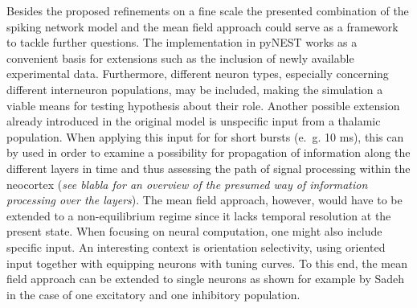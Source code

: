 Besides the proposed refinements on a fine scale
the presented combination of the spiking network model and the mean field approach
could serve as a framework to tackle further questions. 
The implementation in pyNEST works as a convenient basis for extensions 
such as the inclusion of newly available experimental data.
Furthermore, different neuron types, 
especially concerning different interneuron populations, may be included, 
making the simulation a viable means for testing hypothesis about their 
role. 
Another possible extension already introduced in the 
original model \cite{potjans2014} is unspecific input from a thalamic population. 
When applying this input for for short bursts (e.~g. 10 ms), 
this can by used in order to examine a possibility for propagation of information
along the different layers in time and thus assessing the 
path of signal processing within the neocortex
(\emph{see blabla for an overview of 
the presumed way of information processing over the layers}). 
The mean field approach, however, would have to be extended to a non-equilibrium 
regime since it lacks temporal resolution at the present state. 
When focusing on neural computation, one might also include specific input.
An interesting context is orientation selectivity, using 
oriented input together with equipping neurons with tuning curves.
To this end, the mean field approach can be extended to single neurons 
as shown for example by Sadeh~\cite{sadeh2015orientation} 
in the case of one excitatory and one inhibitory population.




